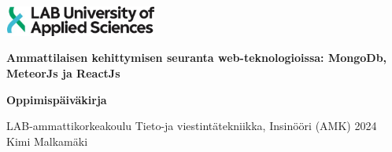 \documentclass[11pt,a4paper,titlepage,oneside]{article}
\renewcommand{\baselinestretch}{1.5}
\begin{document}
\pagestyle{empty}



\includegraphics[width=5cm,height=1cm]{./src/labimg.jpg}

\renewcommand{\baselinestretch}{1} 
\setlength{\parskip}{0cm}

\vspace{86mm}
{\huge
\textbf{Ammattilaisen kehittymisen seuranta web-teknologioissa: MongoDb, MeteorJs ja ReactJs}
}
\newline

{\large

\vspace{5mm}
\textbf{Oppimispäiväkirja}
}

\vspace{80mm}

LAB-ammattikorkeakoulu \newline
\vspace{2mm}
Tieto-ja viestintätekniikka, Insinööri (AMK) \newline
\vspace{2mm}
2024 \newline
\vspace{2mm}
Kimi Malkamäki

\newpage






\begin{spacing}{1} %
    \setlength{\parskip}{0.5cm} 
    
\end{spacing}



\newpage




\setcounter{page}{0}
\pagestyle{empty}

\tableofcontents





\newpage



\end{document}
